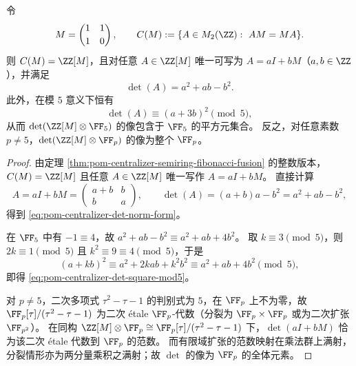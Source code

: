 \begin{proposition}\label{prop:pom-centralizer-det-norm-mod5}
令
\[
M=\begin{pmatrix}1&1\\[2pt]1&0\end{pmatrix},
\qquad
C(M):=\{A\in M_2(\ZZ):\ AM=MA\}.
\]
则 \(C(M)=\ZZ[M]\)，且对任意 \(A\in \ZZ[M]\) 唯一可写为 \(A=aI+bM\)（\(a,b\in\ZZ\)），并满足
\begin{equation}\label{eq:pom-centralizer-det-norm-form}
\det(A)=a^2+ab-b^2.
\end{equation}
此外，在模 \(5\) 意义下恒有
\begin{equation}\label{eq:pom-centralizer-det-square-mod5}
\det(A)\equiv (a+3b)^2\pmod 5,
\end{equation}
从而 \(\det(\ZZ[M]\otimes \FF_5)\) 的像包含于 \(\FF_5\) 的平方元集合。
反之，对任意素数 \(p\neq 5\)，\(\det(\ZZ[M]\otimes \FF_p)\) 的像为整个 \(\FF_p\)。
\end{proposition}
\begin{proof}
由定理 \ref{thm:pom-centralizer-semiring-fibonacci-fusion} 的整数版本，\(C(M)=\ZZ[M]\) 且任意 \(A\in\ZZ[M]\) 唯一写作 \(A=aI+bM\)。
直接计算
\[
A=aI+bM
=\begin{pmatrix}a+b&b\\[2pt]b&a\end{pmatrix},
\qquad
\det(A)=(a+b)a-b^2=a^2+ab-b^2,
\]
得到 \eqref{eq:pom-centralizer-det-norm-form}。
\par
在 \(\FF_5\) 中有 \(-1\equiv 4\)，故
\(
a^2+ab-b^2\equiv a^2+ab+4b^2
\)。
取 \(k\equiv 3\pmod 5\)，则 \(2k\equiv 1\pmod 5\) 且 \(k^2\equiv 9\equiv 4\pmod 5\)，于是
\[
(a+kb)^2\equiv a^2+2kab+k^2b^2\equiv a^2+ab+4b^2\pmod 5,
\]
即得 \eqref{eq:pom-centralizer-det-square-mod5}。
\par
对 \(p\neq 5\)，二次多项式 \(\tau^2-\tau-1\) 的判别式为 \(5\)，在 \(\FF_p\) 上不为零，故
\(
\FF_p[\tau]/(\tau^2-\tau-1)
\)
为二次 \'{e}tale \(\FF_p\)-代数（分裂为 \(\FF_p\times\FF_p\) 或为二次扩张 \(\FF_{p^2}\)）。
在同构 \(\ZZ[M]\otimes\FF_p\cong \FF_p[\tau]/(\tau^2-\tau-1)\) 下，\(\det(aI+bM)\) 恰为该二次 \'{e}tale 代数到 \(\FF_p\) 的范数。
而有限域扩张的范数映射在乘法群上满射，分裂情形亦为两分量乘积之满射；故 \(\det\) 的像为 \(\FF_p\) 的全体元素。
\end{proof}

